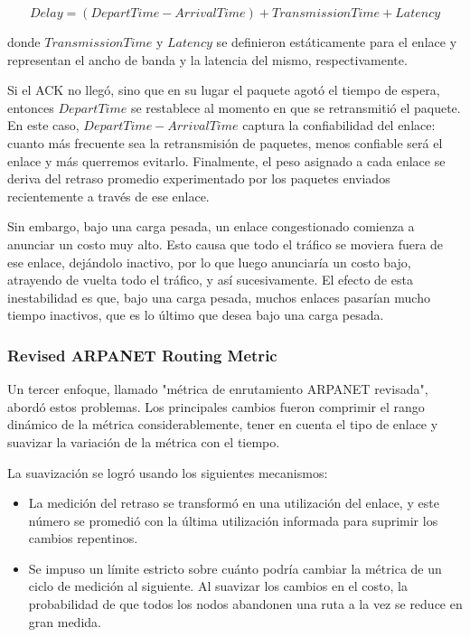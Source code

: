 \[Delay = (DepartTime - ArrivalTime) + TransmissionTime + Latency\]

donde \(TransmissionTime\) y \(Latency\) se definieron estáticamente para el enlace y representan el ancho de banda y la latencia del mismo, respectivamente.

Si el ACK no llegó, sino que en su lugar el paquete agotó el tiempo de espera, entonces \(DepartTime\) se restablece al momento en que se retransmitió el paquete. En este caso, \(DepartTime - ArrivalTime\) captura la confiabilidad del enlace: cuanto más frecuente sea la retransmisión de paquetes, menos confiable será el enlace y más querremos evitarlo. Finalmente, el peso asignado a cada enlace se deriva del retraso promedio experimentado por los paquetes enviados recientemente a través de ese enlace.

Sin embargo, bajo una carga pesada, un enlace congestionado comienza a anunciar un costo muy alto. Esto causa que todo el tráfico se moviera fuera de ese enlace, dejándolo inactivo, por lo que luego anunciaría un costo bajo, atrayendo de vuelta todo el tráfico, y así sucesivamente. El efecto de esta inestabilidad es que, bajo una carga pesada, muchos enlaces pasarían mucho tiempo inactivos, que es lo último que desea bajo una carga pesada.

\subsubsection{Revised ARPANET Routing Metric}
Un tercer enfoque, llamado "métrica de enrutamiento ARPANET revisada", abordó estos problemas. Los principales cambios fueron comprimir el rango dinámico de la métrica considerablemente, tener en cuenta el tipo de enlace y suavizar la variación de la métrica con el tiempo.

La suavización se logró usando los siguientes mecanismos:
\begin{itemize}
  \item La medición del retraso se transformó en una utilización del enlace, y este número se promedió con la última utilización informada para suprimir los cambios repentinos.
  \item Se impuso un límite estricto sobre cuánto podría cambiar la métrica de un ciclo de medición al siguiente. Al suavizar los cambios en el costo, la probabilidad de que todos los nodos abandonen una ruta a la vez se reduce en gran medida.
\end{itemize} 